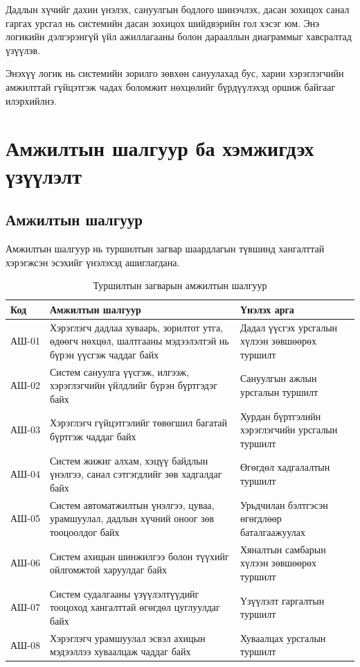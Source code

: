 Дадлын хүчийг дахин үнэлэх, сануулгын бодлого шинэчлэх, дасан зохицох санал гаргах урсгал нь системийн дасан зохицох шийдвэрийн гол хэсэг юм. Энэ логикийн дэлгэрэнгүй үйл ажиллагааны болон дарааллын диаграммыг хавсралтад үзүүлэв.

Энэхүү логик нь системийн зорилго зөвхөн сануулахад бус, харин хэрэглэгчийн амжилттай гүйцэтгэж чадах боломжит нөхцөлийг бүрдүүлэхэд оршиж байгааг илэрхийлнэ.

\section{Амжилтын шалгуур ба хэмжигдэх үзүүлэлт}

\subsection{Амжилтын шалгуур}

Амжилтын шалгуур нь туршилтын загвар шаардлагын түвшинд хангалттай хэрэгжсэн эсэхийг үнэлэхэд ашиглагдана.

\begin{table}[htbp]
\centering
\footnotesize
\setlength{\tabcolsep}{3pt}
\begin{tabular}{|L{1.4cm}|L{6.6cm}|L{4.3cm}|}
\hline
\textbf{Код} & \textbf{Амжилтын шалгуур} & \textbf{Үнэлэх арга} \\
\hline
АШ-01 & Хэрэглэгч дадлаа хуваарь, зорилтот утга, өдөөгч нөхцөл, шалтгааны мэдээлэлтэй нь бүрэн үүсгэж чаддаг байх & Дадал үүсгэх урсгалын хүлээн зөвшөөрөх туршилт \\
\hline
АШ-02 & Систем сануулга үүсгэж, илгээж, хэрэглэгчийн үйлдлийг бүрэн бүртгэдэг байх & Сануулгын ажлын урсгалын туршилт \\
\hline
АШ-03 & Хэрэглэгч гүйцэтгэлийг төвөгшил багатай бүртгэж чаддаг байх & Хурдан бүртгэлийн хэрэглэгчийн урсгалын туршилт \\
\hline
АШ-04 & Систем жижиг алхам, хэцүү байдлын үнэлгээ, санал сэтгэгдлийг зөв хадгалдаг байх & Өгөгдөл хадгалалтын туршилт \\
\hline
АШ-05 & Систем автоматжилтын үнэлгээ, цуваа, урамшуулал, дадлын хүчний оноог зөв тооцоолдог байх & Урьдчилан бэлтгэсэн өгөгдлөөр баталгаажуулах \\
\hline
АШ-06 & Систем ахицын шинжилгээ болон түүхийг ойлгомжтой харуулдаг байх & Хяналтын самбарын хүлээн зөвшөөрөх туршилт \\
\hline
АШ-07 & Систем судалгааны үзүүлэлтүүдийг тооцоход хангалттай өгөгдөл цуглуулдаг байх & Үзүүлэлт гаргалтын туршилт \\
\hline
АШ-08 & Хэрэглэгч урамшуулал эсвэл ахицын мэдээллээ хуваалцаж чаддаг байх & Хуваалцах урсгалын туршилт \\
\hline
\end{tabular}
\caption{Туршилтын загварын амжилтын шалгуур}
\end{table}

